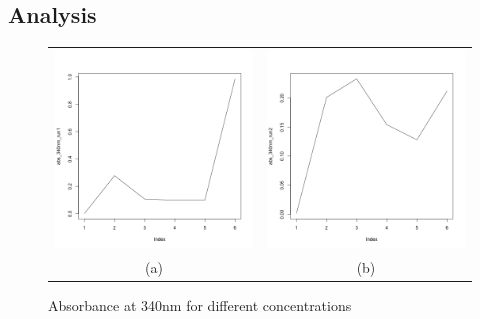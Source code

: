 \documentclass[a4paper,11pt]{article}
\begin{document}
        \subsection*{Analysis}
            \begin{figure}[H]
                \centering
                \begin{tabular}{cc}
                    \includegraphics[width=200px]{../resources/absorption_r1_340.png} &
                    \includegraphics[width=200px]{../resources/absorption_r2_340.png} \\
                    (a) & (b)\\
                \end{tabular}
                \caption{Absorbance at 340nm for different concentrations}
                \label{fig:abs_340}
            \end{figure}
    \pagebreak
\end{document}
